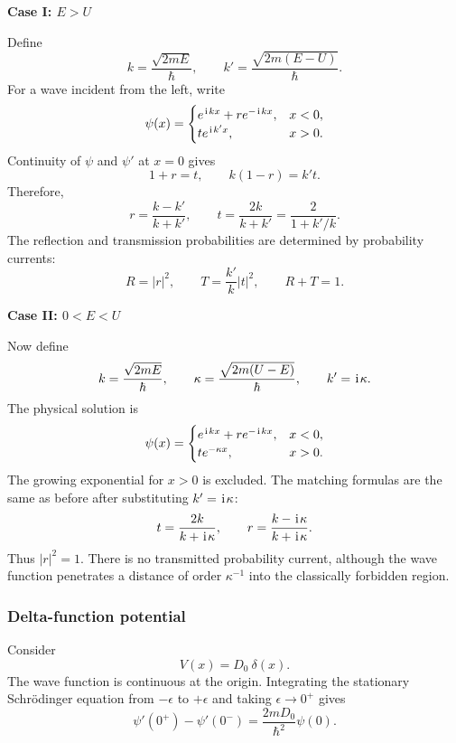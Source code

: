 \textbf{Case I: $E>U$}

Define
\begin{equation}
 k=\frac{\sqrt{2mE}}{\hbar},
 \qquad
 k'=\frac{\sqrt{2m(E-U)}}{\hbar}.
\end{equation}
For a wave incident from the left, write
\begin{equation}
 \psi(x)=
 \begin{cases}
 e^{\hspace{1pt}\mathrm{i}\hspace{1pt} kx}+r e^{-\hspace{1pt}\mathrm{i}\hspace{1pt} kx}, & x<0,\\
 t e^{\hspace{1pt}\mathrm{i}\hspace{1pt} k'x}, & x>0.
 \end{cases}
\end{equation}
Continuity of $\psi$ and $\psi'$ at $x=0$ gives
\begin{equation}
 1+r=t,
 \qquad
 k(1-r)=k't.
\end{equation}
Therefore,
\begin{equation}
 \boxed{r=\frac{k-k'}{k+k'},
 \qquad
 t=\frac{2k}{k+k'}=\frac{2}{1+k'/k}.}
\end{equation}
The reflection and transmission probabilities are determined by probability
currents:
\begin{equation}
 R=|r|^2,
 \qquad
 T=\frac{k'}{k}|t|^2,
 \qquad
 R+T=1.
\end{equation}

\textbf{Case II: $0<E<U$}

Now define
\begin{equation}
 k=\frac{\sqrt{2mE}}{\hbar},
 \qquad
 \kappa=\frac{\sqrt{2m(U-E)}}{\hbar},
 \qquad k'=\hspace{1pt}\mathrm{i}\hspace{1pt}\kappa.
\end{equation}
The physical solution is
\begin{equation}
 \psi(x)=
 \begin{cases}
 e^{\hspace{1pt}\mathrm{i}\hspace{1pt} kx}+r e^{-\hspace{1pt}\mathrm{i}\hspace{1pt} kx}, & x<0,\\
 t e^{-\kappa x}, & x>0.
 \end{cases}
\end{equation}
The growing exponential for $x>0$ is excluded. The matching formulas are the
same as before after substituting $k'=\hspace{1pt}\mathrm{i}\hspace{1pt}\kappa$:
\begin{equation}
 t=\frac{2k}{k+\hspace{1pt}\mathrm{i}\hspace{1pt}\kappa},
 \qquad
 r=\frac{k-\hspace{1pt}\mathrm{i}\hspace{1pt}\kappa}{k+\hspace{1pt}\mathrm{i}\hspace{1pt}\kappa}.
\end{equation}
Thus $|r|^2=1$. There is no transmitted probability current, although the
wave function penetrates a distance of order $\kappa^{-1}$ into the
classically forbidden region.

\subsubsection{Delta-function potential}
Consider 
\begin{equation}
 V(x)=D_0~\delta(x).
\end{equation}
The wave function is continuous at the origin. Integrating the stationary
Schr\"odinger equation from $-\epsilon$ to $+\epsilon$ and taking
$\epsilon\to0^+$ gives
\begin{equation}
 \boxed{
 \psi'(0^+)-\psi'(0^-)=\frac{2mD_0}{\hbar^2}\psi(0).}
\end{equation}

